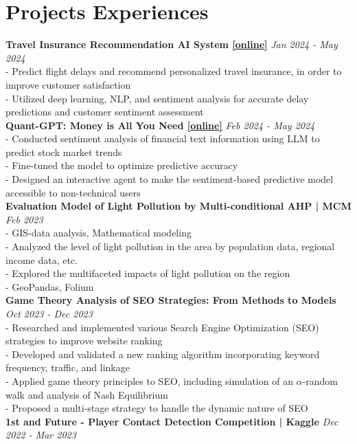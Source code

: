 \documentclass[a4paper,10pt]{article}
\begin{document}
\section*{Projects Experiences}
\textbf{Travel Insurance Recommendation AI System \href{https://github.com/TobyYang7/Travel-Insurance-Recommendation-AI-System}{[online]}} \hfill \textit{Jan 2024 - May 2024}\\
- Predict flight delays and recommend personalized travel insurance, in order to improve customer satisfaction\\
- Utilized deep learning, NLP, and sentiment analysis for accurate delay predictions and customer sentiment assessment\\
\textbf{Quant-GPT: Money is All You Need \href{https://github.com/TobyYang7/Quant-GPT}{[online]}} \hfill \textit{Feb 2024 - May 2024}\\
- Conducted sentiment analysis of financial text information using LLM to predict stock market trends\\
- Fine-tuned the model to optimize predictive accuracy\\
- Designed an interactive agent to make the sentiment-based predictive model accessible to non-technical users\\
\textbf{Evaluation Model of Light Pollution by Multi-conditional AHP | MCM} \hfill \textit{Feb 2023}\\
- GIS-data analysis, Mathematical modeling\\
- Analyzed the level of light pollution in the area by population data, regional income data, etc.\\
- Explored the multifaceted impacts of light pollution on the region\\
- GeoPandas, Folium\\
\textbf{Game Theory Analysis of SEO Strategies: From Methods to Models} \hfill \textit{Oct 2023 - Dec 2023}\\
- Researched and implemented various Search Engine Optimization (SEO) strategies to improve website ranking\\
- Developed and validated a new ranking algorithm incorporating keyword frequency, traffic, and linkage\\
- Applied game theory principles to SEO, including simulation of an $\alpha$-random walk and analysis of Nash Equilibrium\\
- Proposed a multi-stage strategy to handle the dynamic nature of SEO\\
\textbf{1st and Future - Player Contact Detection Competition | Kaggle} \hfill \textit{Dec 2022 - Mar 2023}\\
\end{document}
